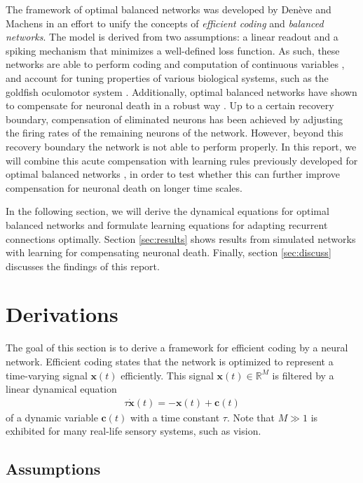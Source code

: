 \documentclass[twoside,twocolumn]{article}
\renewcommand{\b}[1]{\textbf{#1}}
\newcommand{\R}{\mathbb{R}}
\begin{document}
The framework of optimal balanced networks was developed by Den\`{e}ve and Machens \cite{Deneve2016, Boerlin2013} in an effort to unify the concepts of \textit{efficient coding} and \textit{balanced networks}. The model is derived from two assumptions: a linear readout and a spiking mechanism that minimizes a well-defined loss function. As such, these networks are able to perform coding and computation of continuous variables \cite{Boerlin2013}, and account for tuning properties of various biological systems, such as the goldfish oculomotor system \cite{Barrett2013}. Additionally, optimal balanced networks have shown to compensate for neuronal death in a robust way \cite{Barrett2015}. Up to a certain recovery boundary, compensation of eliminated neurons has been achieved by adjusting the firing rates of the remaining neurons of the network. However, beyond this recovery boundary the network is not able to perform properly. In this report, we will combine this acute compensation with learning rules previously developed for optimal balanced networks \cite{Brendel2016}, in order to test whether this can further improve compensation for neuronal death on longer time scales.

In the following section, we will derive the dynamical equations for optimal balanced networks and formulate learning equations for adapting recurrent connections optimally. Section \ref{sec:results} shows results from simulated networks with learning for compensating neuronal death. Finally, section \ref{sec:discuss} discusses the findings of this report.

\section{Derivations}
\label{sec:derive}

The goal of this section is to derive a framework for efficient coding by a neural network. Efficient coding states that the network is optimized to represent a time-varying signal $\b{x}(t)$ efficiently. This signal $\b{x}(t)\in \R^M$ is filtered by a linear dynamical equation
\begin{align}
\tau\dot{\b{x}}(t) = - \b{x}(t) + \b{c}(t)
\end{align}
of a dynamic variable $\b{c}(t)$ with a time constant $\tau$. Note that $M \gg 1$ is exhibited for many real-life sensory systems, such as vision.

\subsection{Assumptions}
\end{document}
